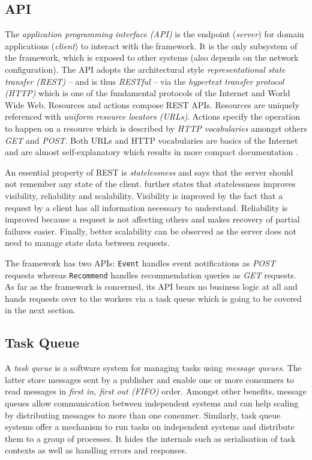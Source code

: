\subsection{API}

The \emph{application programming interface (API)} is the endpoint (\emph{server}) for domain applications (\emph{client}) to interact with the framework. It is the only subsystem of the framework, which is exposed to other systems (also depends on the network configuration). The API adopts the architectural style \emph{representational state transfer (REST)} -- and is thus \emph{RESTful} -- via the \emph{hypertext transfer protocol (HTTP)} which is one of the fundamental protocols of the Internet and World Wide Web. Resources and actions compose REST APIs. Resources are uniquely referenced with \emph{uniform resource locators (URLs)}. Actions specify the operation to happen on a resource which is described by \emph{HTTP vocabularies} amongst others \emph{GET} and \emph{POST}. Both URLs and HTTP vocabularies are basics of the Internet and are almost self-explanatory which results in more compact documentation \cite{fielding00}.

An essential property of REST is \emph{statelessness} and says that the server should not remember any state of the client. \citet{fielding00} further states that statelessness improves visibility, reliability and scalability. Visibility is improved by the fact that a request by a client has all information necessary to understand. Reliability is improved because a request is not affecting others and makes recovery of partial failures easier. Finally, better scalability can be observed as the server does not need to manage state data between requests.

The framework has two APIs: \texttt{Event} handles event notifications as \emph{POST} requests whereas \texttt{Recommend} handles recommendation queries as \emph{GET} requests. As far as the framework is concerned, its API bears no business logic at all and hands requests over to the workers via a task queue which is going to be covered in the next section.

\subsection{Task Queue}

A \emph{task queue} is a software system for managing tasks using \emph{message queues}. The latter store messages sent by a publisher and enable one or more consumers to read messages in \emph{first in, first out (FIFO)} order. Amongst other benefits, message queues allow communication between independent systems and can help scaling by distributing messages to more than one consumer. Similarly, task queue systems offer a mechanism to run tasks on independent systems and distribute them to a group of processes. It hides the internals such as serialisation of task contexts as well as handling errors and responses.

